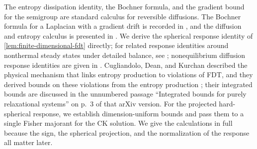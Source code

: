 The entropy dissipation identity, the Bochner formula, and the gradient bound for the semigroup are standard calculus for reversible diffusions. The Bochner formula for a Laplacian with a gradient drift is recorded in \cite[Proposition~3, equation~(4b), p.~187]{bakryemery1985}, and the diffusion and entropy calculus is presented in \cite[Chapter~3 and Proposition~5.2.2, p.~245]{bgl2014}. We derive the spherical response identity of \cref{lem:finite-dimensional-fdt} directly; for related response identities around nonthermal steady states under detailed balance, see \cite[Sections~2--3, pp.~27--30]{agarwal1972}; nonequilibrium diffusion response identities are given in \cite[equations~(6) and~(11), pp.~010602-2--010602-3]{bmw2009}. Cugliandolo, Dean, and Kurchan described the physical mechanism that links entropy production to violations of FDT, and they derived bounds on these violations from the entropy production \cite[arXiv version~2, equations~(12)--(13), p.~3, and~(18), p.~4]{cdk1997}; their integrated bounds are discussed in the unnumbered passage ``Integrated bounds for purely relaxational systems'' on p.~3 of that arXiv version. For the projected hard-spherical response, we establish dimension-uniform bounds and pass them to a single Fisher majorant for the CK solution. We give the calculations in full because the sign, the spherical projection, and the normalization of the response all matter later.

